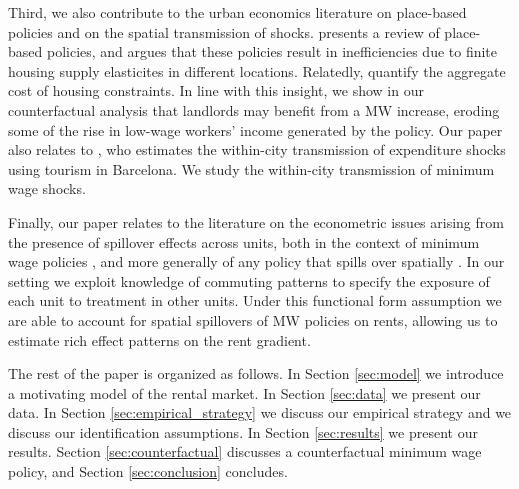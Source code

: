 Third, we also contribute to the urban economics literature on place-based 
policies and on the spatial transmission of shocks.
\textcite{KlineMoretti2014} presents a review of place-based policies, and 
argues that these policies result in inefficiencies due to finite housing supply 
elasticites in different locations.
Relatedly, \textcite{HsiehMoretti2019} quantify the aggregate cost of housing 
constraints.
In line with this insight, we show in our counterfactual analysis that landlords
may benefit from a MW increase, eroding some of the rise in low-wage workers' 
income generated by the policy.
Our paper also relates to \textcite{AllenEtAl2020}, who estimates the 
within-city transmission of expenditure shocks using tourism in Barcelona.
We study the within-city transmission of minimum wage shocks.

Finally, our paper relates to the literature on the econometric issues arising 
from the presence of spillover effects across units,
both in the context of minimum wage policies \parencite{Kuehn2016, Huang2020}, 
and more generally of any policy that spills over spatially
\parencite{DelgadoFlorax2015, Butts2021}.
In our setting we exploit knowledge of commuting patterns to specify the 
exposure of each unit to treatment in other units.
Under this functional form assumption we are able to account for spatial 
spillovers of MW policies on rents, allowing us to estimate rich effect patterns 
on the rent gradient.

The rest of the paper is organized as follows.
In Section \ref{sec:model} we introduce a motivating model of the rental market.
In Section \ref{sec:data} we present our data.
In Section \ref{sec:empirical_strategy} we discuss our empirical strategy and
we discuss our identification assumptions.
In Section \ref{sec:results} we present our results.
Section \ref{sec:counterfactual} discusses a counterfactual minimum wage policy, and
Section \ref{sec:conclusion} concludes.
